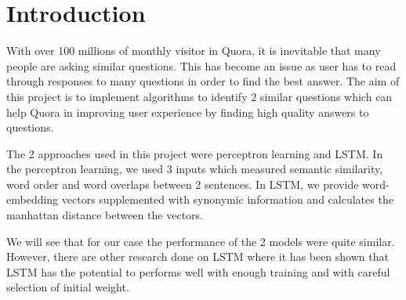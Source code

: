 \section{Introduction}
\par With over 100 millions of monthly visitor in Quora, it is inevitable that many people are asking similar questions. This has become an issue as user has to read through responses to many questions in order to find the best answer. The aim of this project is to implement algorithms to identify 2 similar questions which can help Quora in improving user experience by finding high quality answers to questions.

\par The 2 approaches used in this project were perceptron learning and LSTM. In the perceptron learning, we used 3 inputs which measured semantic similarity, word order and word overlaps between 2 sentences. In LSTM, we provide word-embedding vectors supplemented with synonymic information and calculates the manhattan distance between the vectors.

\par We will see that for our case the performance of the 2 models were quite similar. However, there are other research done on LSTM where it has been shown that LSTM has the potential to performs well with enough training and with careful selection of initial weight.